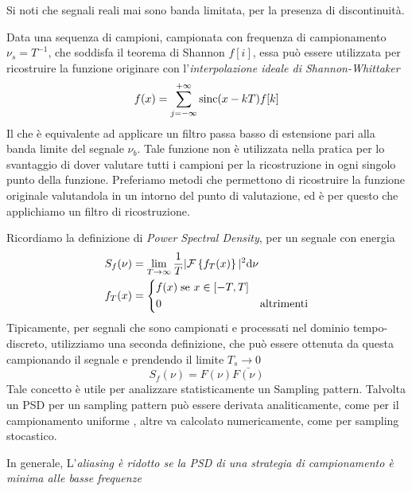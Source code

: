 Si noti che segnali reali mai sono banda limitata, per la presenza di discontinuit\`a.\par
Data una sequenza di campioni, campionata con frequenza di campionamento $\nu_s=T^{-1}$, che soddisfa il teorema di Shannon $f[i]$, essa pu\`o 
essere utilizzata per ricostruire la funzione originare con l'\textit{interpolazione ideale di Shannon-Whittaker}
\begin{equation}
	f(x)=\sum_{j=-\infty}^{+\infty}\operatorname{sinc}(x-kT)f[k]
\end{equation}
Il che \`e equivalente ad applicare un filtro passa basso di estensione pari alla banda limite del segnale $\nu_b$. Tale funzione non \`e utilizzata 
nella pratica per lo svantaggio di dover valutare tutti i campioni per la ricostruzione in ogni singolo punto della funzione. Preferiamo metodi che 
permettono di ricostruire la funzione originale valutandola in un intorno del punto di valutazione, ed \`e per questo che applichiamo un filtro di 
ricostruzione.\par
Ricordiamo la definizione di \textit{Power Spectral Density}, per un segnale con energia 
\begin{align}
	S_f(\nu)&=\lim_{T\to\infty}\frac{1}{T}|\mathcal{F}\left\{f_T(x)\right\}|^2\mathrm{d}\nu\\
	f_T(x)&=\left\{\begin{aligned}
		&f(x)\;\text{se }x\in[-T,T]\nonumber\\
		&0&\text{altrimenti}\nonumber
	\end{aligned}\right.\nonumber
\end{align}
Tipicamente, per segnali che sono campionati e processati nel dominio tempo-discreto, utilizziamo una seconda definizione, che pu\`o essere ottenuta 
da questa campionando il segnale e prendendo il limite $T_s\to0$
\begin{equation}
	S_f(\nu)=F(\nu)\bar{F(\nu)}
\end{equation}
Tale concetto \`e utile per analizzare statisticamente un Sampling pattern. Talvolta un PSD per un sampling pattern pu\`o essere derivata 
analiticamente, come per il campionamento uniforme \cite{pharr}, altre va calcolato numericamente, come per sampling stocastico.\par
In generale, L'\textit{aliasing \`e ridotto se la PSD di una strategia di campionamento \`e minima alle basse frequenze}
